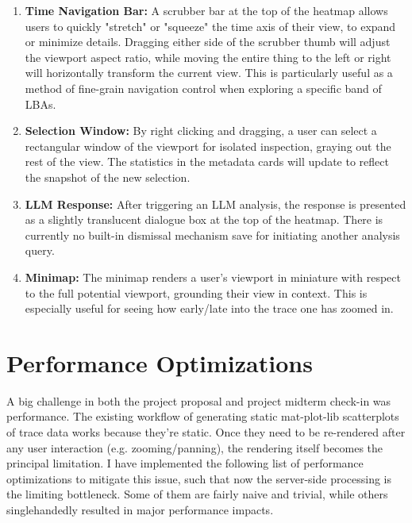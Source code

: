 \documentclass[11pt]{article}
\begin{document}
\begin{enumerate}
    \item \textbf{Time Navigation Bar:} A scrubber bar at the top of the heatmap allows users to quickly "stretch" or "squeeze" the time axis of their view, to expand or minimize details.  Dragging either side of the scrubber thumb will adjust the viewport aspect ratio, while moving the entire thing to the left or right will horizontally transform the current view.  This is particularly useful as a method of fine-grain navigation control when exploring a specific band of LBAs.
    \item \textbf{Selection Window:} By right clicking and dragging, a user can select a rectangular window of the viewport for isolated inspection, graying out the rest of the view.  The statistics in the metadata cards will update to reflect the snapshot of the new selection.
    \item \textbf{LLM Response:} After triggering an LLM analysis, the response is presented as a slightly translucent dialogue box at the top of the heatmap.  There is currently no built-in dismissal mechanism save for initiating another analysis query.
    \item \textbf{Minimap:} The minimap renders a user's viewport in miniature with respect to the full potential viewport, grounding their view in context.  This is especially useful for seeing how early/late into the trace one has zoomed in.
\end{enumerate}

\section{Performance Optimizations}
A big challenge in both the project proposal and project midterm check-in was performance.  The existing workflow of generating static mat-plot-lib scatterplots of trace data works because they're static.  Once they need to be re-rendered after any user interaction (e.g. zooming/panning), the rendering itself becomes the principal limitation.  I have implemented the following list of performance optimizations to mitigate this issue, such that now the server-side processing is the limiting bottleneck.  Some of them are fairly naive and trivial, while others singlehandedly resulted in major performance impacts.
\end{document}
